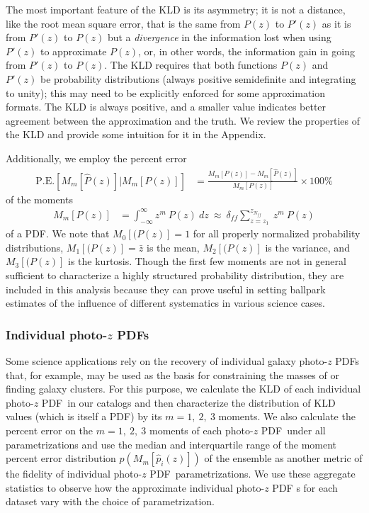 \documentclass[\docopts]{\docclass}
\newcommand{\pz}{photo-$z$ PDF}
\begin{document}
The most important feature of the KLD is its asymmetry; it is not a distance, 
like the root mean square error, that is the same from $P(z)$ to $P'(z)$ as it 
is from $P'(z)$ to $P(z)$ but a \textit{divergence} in the information lost 
when using $P'(z)$ to approximate $P(z)$, or, in other words, the information 
gain in going from $P'(z)$ to $P(z)$.
The KLD requires that both functions $P(z)$ and $P'(z)$ be probability 
distributions (always positive semidefinite and integrating to unity); this may 
need to be explicitly enforced for some approximation formats.
The KLD is always positive, and a smaller value indicates better agreement 
between the approximation and the truth.
We review the properties of the KLD and provide some intuition for it in the 
Appendix.

Additionally, we employ the percent error
\begin{align}
  \label{eq:percent_error}
  \mathrm{P.E.}[M_{m}[\hat{P}(z)] | M_{m}[P(z)]] &= \frac{M_{m}[P(z)] - 
M_{m}[\hat{P}(z)]}{M_{m}[P(z)]}\times100\%
\end{align}
of the moments
\begin{align}
  \label{eq:moment}
  M_{m}[P(z)] &= \int_{-\infty}^{\infty} z^{m}\ P(z)\ dz\ \approx\  
\delta_{ff}\sum_{z=z_{1}}^{z_{N_{ff}}}\ z^{m}\ P(z)
\end{align}
of a PDF.
We note that $M_{0}[(P(z)]=1$ for all properly normalized probability 
distributions, $M_{1}[(P(z)]=\bar{z}$ is the mean, $M_{2}[(P(z)]$ is the 
variance, and $M_{3}[(P(z)]$ is the kurtosis.
Though the first few moments are not in general sufficient to characterize a 
highly structured probability distribution, they are included in this analysis 
because they can prove useful in setting ballpark estimates of the influence of 
different systematics in various science cases.

\subsubsection{Individual \pz s}
\label{sec:individual_metric}

Some science applications rely on the recovery of individual galaxy \pz s that, 
for example, may be used as the basis for constraining the masses of 
\citep{applegate_weighing_2014} or finding \citep{radovich_searching_2017} 
galaxy clusters.
For this purpose, we calculate the KLD of each individual \pz\ in our catalogs 
and then characterize the distribution of KLD values (which is itself a PDF) by 
its $m=1,\ 2,\ 3$ moments.
We also calculate the percent error on the $m=1,\ 2,\ 3$ moments of each \pz\ 
under all parametrizations and use the median and interquartile range of the 
moment percent error distribution $p(M_{m}[\hat{p}_{i}(z)])$ of the ensemble as 
another metric of the fidelity of individual \pz\ parametrizations.
We use these aggregate statistics to observe how the approximate individual \pz 
s for each dataset vary with the choice of parametrization.
\end{document}
